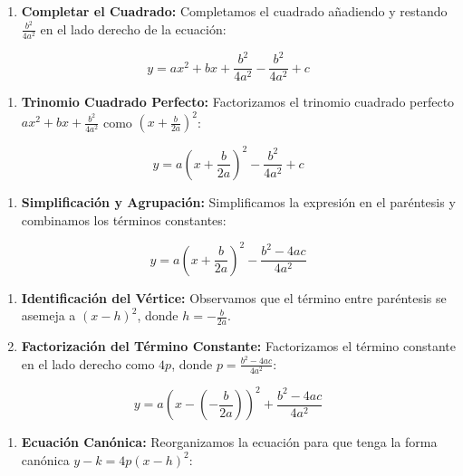 \documentclass[]{book}
\providecommand{\tightlist}{%
  \setlength{\itemsep}{0pt}\setlength{\parskip}{0pt}}
\begin{document}
\begin{enumerate}
\def\labelenumi{\arabic{enumi}.}
\tightlist
\item
  \textbf{Completar el Cuadrado:} Completamos el cuadrado añadiendo y
  restando \(\frac{b^2}{4a^2}\) en el lado derecho de la ecuación:
\end{enumerate}

\[y = ax^2 + bx + \frac{b^2}{4a^2} - \frac{b^2}{4a^2} + c\]

\begin{enumerate}
\def\labelenumi{\arabic{enumi}.}
\setcounter{enumi}{1}
\tightlist
\item
  \textbf{Trinomio Cuadrado Perfecto:} Factorizamos el trinomio cuadrado
  perfecto \(ax^2 + bx + \frac{b^2}{4a^2}\) como
  \(\left(x + \frac{b}{2a}\right)^2\):
\end{enumerate}

\[y = a\left(x + \frac{b}{2a}\right)^2 - \frac{b^2}{4a^2} + c\]

\begin{enumerate}
\def\labelenumi{\arabic{enumi}.}
\setcounter{enumi}{2}
\tightlist
\item
  \textbf{Simplificación y Agrupación:} Simplificamos la expresión en el
  paréntesis y combinamos los términos constantes:
\end{enumerate}

\[y = a\left(x + \frac{b}{2a}\right)^2 - \frac{b^2 - 4ac}{4a^2}\]

\begin{enumerate}
\def\labelenumi{\arabic{enumi}.}
\setcounter{enumi}{3}
\item
  \textbf{Identificación del Vértice:} Observamos que el término entre
  paréntesis se asemeja a \((x - h)^2\), donde \(h = -\frac{b}{2a}\).
\item
  \textbf{Factorización del Término Constante:} Factorizamos el término
  constante en el lado derecho como \(4p\), donde
  \(p = \frac{b^2 - 4ac}{4a^2}\):
\end{enumerate}

\[y = a\left(x - \left(-\frac{b}{2a}\right)\right)^2 + \frac{b^2 - 4ac}{4a^2}\]

\begin{enumerate}
\def\labelenumi{\arabic{enumi}.}
\setcounter{enumi}{5}
\tightlist
\item
  \textbf{Ecuación Canónica:} Reorganizamos la ecuación para que tenga
  la forma canónica \(y - k = 4p(x - h)^2\):
\end{enumerate}
\end{document}
